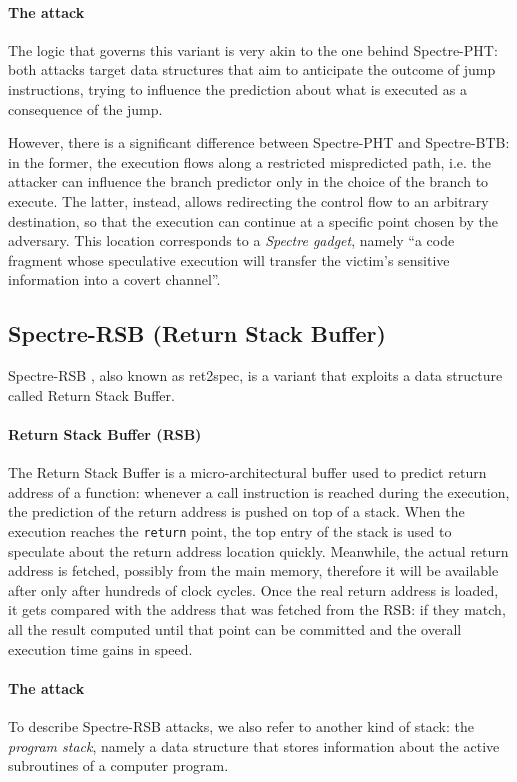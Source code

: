 \documentclass[target=mst,aauheader=aics]{thud}
\theoremstyle{definition}
\begin{document}
	\paragraph{The attack} The logic that governs this variant is very akin to the one behind Spectre-PHT: both attacks target data structures that aim to anticipate the outcome of jump instructions, trying to influence the prediction about what is executed as a consequence of the jump.
	
	However, there is a significant difference between Spectre-PHT and Spectre-BTB: in the former, the execution flows along a restricted mispredicted path, i.e. the attacker can influence the branch predictor only in the choice of the branch to execute. The latter, instead, allows redirecting the control flow to an arbitrary destination, so that the execution can continue at a specific point chosen by the adversary. This location corresponds to a \textit{Spectre gadget}, namely ``a code fragment whose speculative execution will transfer the victim’s sensitive information into a covert channel''\cite{Kocher2019}.
	
	\subsection{Spectre-RSB (Return Stack Buffer)}\label{sec:spectre-rsb}
	Spectre-RSB \cite{Maisuradze2018, Koruyeh2018, Canella2019}, also known as ret2spec, is a variant that exploits a data structure called Return Stack Buffer.
	
	\paragraph{Return Stack Buffer (RSB)}The Return Stack Buffer is a micro-architectural buffer used to predict return address of a function: whenever a call instruction is reached during the execution, the prediction of the return address is pushed on top of a stack. When the execution reaches the \texttt{return} point, the top entry of the stack is used to speculate about the return address location quickly. Meanwhile, the actual return address is fetched, possibly from the main memory, therefore it will be available after only after hundreds of clock cycles. Once the real return address is loaded, it gets compared with the address that was fetched from the RSB: if they match, all the result computed until that point can be committed and the overall execution time gains in speed.
	
	\paragraph{The attack} To describe Spectre-RSB attacks, we also refer to another kind of stack: the \textit{program stack}, namely a data structure that stores information about the active subroutines of a computer program.
	
\end{document}
